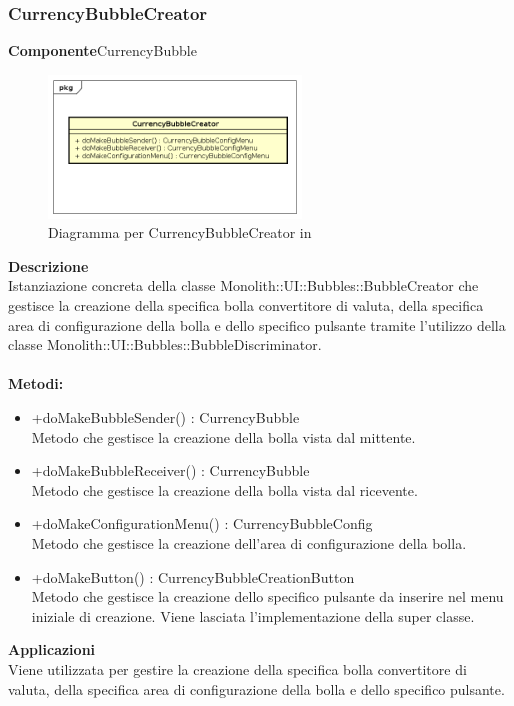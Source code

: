 \subsubsection{CurrencyBubbleCreator}
\textbf{Componente}CurrencyBubble\\
   \FloatBarrier
   \begin{figure}[ht]
   \centering
   \includegraphics[width=0.6\textwidth]{img/single-CurrencyBubbleCreator}
   \caption{{Diagramma per CurrencyBubbleCreator in }}
\end{figure}
\FloatBarrier
\textbf{Descrizione}\\
Istanziazione concreta della classe Monolith::UI::Bubbles::BubbleCreator che gestisce la creazione della specifica bolla convertitore di valuta, della specifica area di configurazione della bolla e dello specifico pulsante tramite l'utilizzo della classe Monolith::UI::Bubbles::BubbleDiscriminator.
\\
\\
\textbf{Metodi:} 
\begin{itemize}
\item +doMakeBubbleSender() : CurrencyBubble 
\\
Metodo che gestisce la creazione della bolla vista dal mittente.
\item +doMakeBubbleReceiver() : CurrencyBubble 
\\
Metodo che gestisce la creazione della bolla vista dal ricevente.
\item +doMakeConfigurationMenu() : CurrencyBubbleConfig 
\\
Metodo che gestisce la creazione dell'area di configurazione della bolla.
\item +doMakeButton() : CurrencyBubbleCreationButton 
\\
Metodo che gestisce la creazione dello specifico pulsante da inserire nel menu iniziale di creazione. Viene lasciata l'implementazione della super classe.
\end{itemize} 


\textbf{Applicazioni}\\
Viene utilizzata per gestire la creazione della specifica bolla convertitore di valuta, della specifica area di configurazione della bolla e dello specifico pulsante. 


